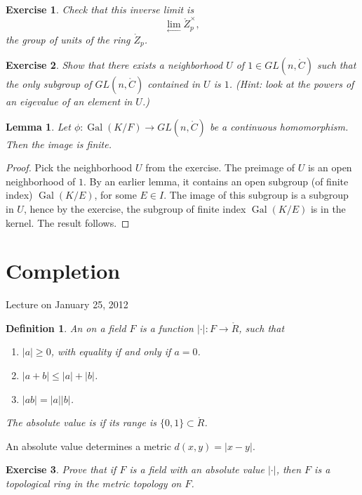 \documentclass{amsart}
\newtheorem{definition}[equation]{Definition}
\newtheorem{lemma}[equation]{Lemma}
\newtheorem{exercise}{Exercise}
\def\abs#1{{|#1|}}
\def\op#1{{\operatorname{#1}}}
\def\CC{\ring{C}}
\def\RR{\ring{R}}
\def\oG{\op{Gal}}
\begin{document}
\begin{exercise}
Check that this inverse limit is
\[
\lim_{\leftarrow} \ring{Z}_p^\times,
\]
the group of units of the ring $\ring{Z}_p$.
\end{exercise}

\begin{exercise}  Show that there exists a neighborhood $U$ of $1\in GL(n,\CC)$
such that the only subgroup of $GL(n,\CC)$ contained in $U$ is $1$.
(Hint: look at the powers of an eigevalue of an element in $U$.)
\end{exercise}

\begin{lemma} Let $\phi:\oG(K/F)\to GL(n,\CC)$ be a continuous homomorphism.
Then the image is finite.
\end{lemma}

\begin{proof}  Pick the neighborhood $U$ from the exercise.  The preimage of $U$
is an open neighborhood of $1$.  By an earlier lemma, it contains an open subgroup
(of finite index)
$\oG(K/E)$, for some $E\in I$.  The image of this subgroup is a subgroup
in $U$, hence by the exercise, the subgroup of finite index
$\oG(K/E)$ is in the kernel.  The result follows.
\end{proof}





\newpage
\section{Completion}

Lecture on January 25, 2012

\begin{definition} An  on a field $F$ is a function
$\abs{\cdot}:F\to \RR$, such that
\begin{enumerate}
\item $\abs{a}\ge 0$, with equality if and only if $a=0$.
\item $\abs{a + b}\le \abs{a} + \abs{b}$.
\item $\abs{a b} = \abs{a}\abs{b}$.
\end{enumerate}
The absolute value is  if its range is $\{0,1\}\subset\RR$.
\end{definition}

An absolute value determines a metric $d(x,y) = \abs{x-y}$.

\begin{exercise} Prove that if $F$ is a field with an absolute value
  $\abs{\cdot}$, then $F$ is a topological ring in the metric topology
  on $F$.
\end{exercise}
\end{document}
